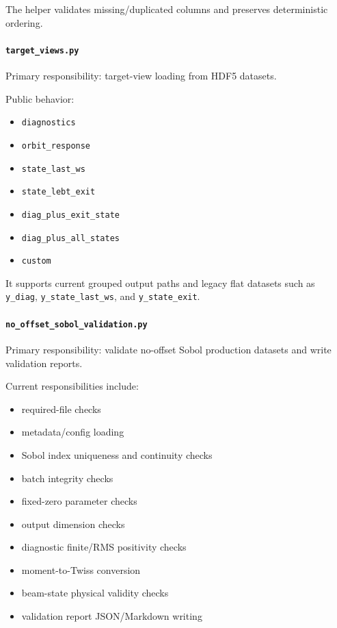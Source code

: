 \documentclass[
]{article}
\providecommand{\tightlist}{%
  \setlength{\itemsep}{0pt}\setlength{\parskip}{0pt}}
\begin{document}
The helper validates missing/duplicated columns and preserves
deterministic ordering.

\hypertarget{target_views.py}{%
\paragraph{\texorpdfstring{\texttt{target\_views.py}}{target\_views.py}}\label{target_views.py}}

Primary responsibility: target-view loading from HDF5 datasets.

Public behavior:

\begin{itemize}
\tightlist
\item
  \texttt{diagnostics}
\item
  \texttt{orbit\_response}
\item
  \texttt{state\_last\_ws}
\item
  \texttt{state\_lebt\_exit}
\item
  \texttt{diag\_plus\_exit\_state}
\item
  \texttt{diag\_plus\_all\_states}
\item
  \texttt{custom}
\end{itemize}

It supports current grouped output paths and legacy flat datasets such
as \texttt{y\_diag}, \texttt{y\_state\_last\_ws}, and
\texttt{y\_state\_exit}.

\hypertarget{no_offset_sobol_validation.py}{%
\paragraph{\texorpdfstring{\texttt{no\_offset\_sobol\_validation.py}}{no\_offset\_sobol\_validation.py}}\label{no_offset_sobol_validation.py}}

Primary responsibility: validate no-offset Sobol production datasets and
write validation reports.

Current responsibilities include:

\begin{itemize}
\tightlist
\item
  required-file checks
\item
  metadata/config loading
\item
  Sobol index uniqueness and continuity checks
\item
  batch integrity checks
\item
  fixed-zero parameter checks
\item
  output dimension checks
\item
  diagnostic finite/RMS positivity checks
\item
  moment-to-Twiss conversion
\item
  beam-state physical validity checks
\item
  validation report JSON/Markdown writing
\end{itemize}
\end{document}

